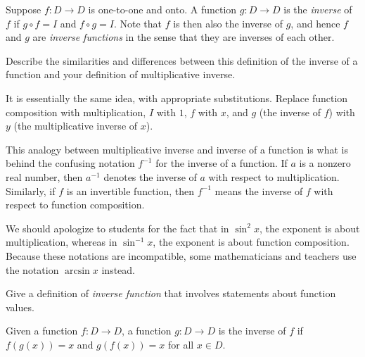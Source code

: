 \documentclass[space,handout,nooutcomes]{ximera}
\begin{document}
\begin{definition}
Suppose $f:D\rightarrow D$ is one-to-one and onto.  A function $g:D\rightarrow D$ is the \emph{inverse} of $f$ if $g\circ f = I$ and $f\circ g = I$.  Note that $f$ is then also the inverse of $g$, and hence $f$ and $g$ are \emph{inverse functions} in the sense that they are inverses of each other.  
\end{definition}

\begin{question}
Describe the similarities and differences between this definition of the inverse of a function and your definition of multiplicative inverse.  
\begin{freeResponse}
\begin{hint}
It is essentially the same idea, with appropriate substitutions.  Replace function composition with multiplication, $I$ with $1$, $f$ with $x$, and $g$ (the inverse of $f$) with $y$ (the multiplicative inverse of $x$).  
\end{hint}
\end{freeResponse}
\end{question}

\begin{remark}
This analogy between multiplicative inverse and inverse of a function is what is behind the confusing notation $f^{-1}$ for the inverse of a function.  If $a$ is a nonzero real number, then $a^{-1}$ denotes the inverse of $a$ with respect to multiplication.  Similarly, if $f$ is an invertible function, then $f^{-1}$ means the inverse of $f$ with respect to function composition. 

We should apologize to students for the fact that in $\sin^2 x$, the exponent is about multiplication, whereas in $\sin^{-1} x$, the exponent is about function composition.  Because these notations are incompatible, some mathematicians and teachers use the notation $\arcsin x$ instead.  
\end{remark}

\begin{question}
Give a definition of \emph{inverse function} that involves statements about function values.    
\begin{freeResponse}
\begin{hint}
Given a function $f:D\rightarrow D$, a function $g:D\rightarrow D$ is the inverse of $f$ if $f(g(x)) = x$ and $g(f(x)) = x$ for all $x\in D$.  
\end{hint}
\end{freeResponse}
\end{question}
\end{document}
